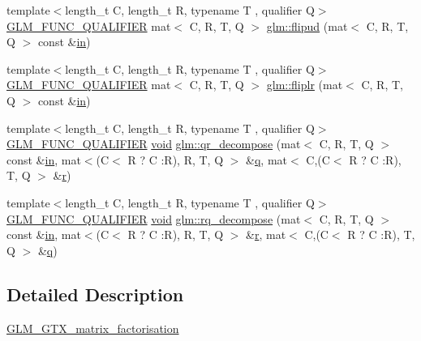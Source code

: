 \begin{DoxyCompactItemize}
\item 
{\footnotesize template$<$length\+\_\+t C, length\+\_\+t R, typename T , qualifier Q$>$ }\\\mbox{\hyperlink{setup_8hpp_a33fdea6f91c5f834105f7415e2a64407}{G\+L\+M\+\_\+\+F\+U\+N\+C\+\_\+\+Q\+U\+A\+L\+I\+F\+I\+ER}} mat$<$ C, R, T, Q $>$ \mbox{\hyperlink{group__gtx__matrix__factorisation_ga85003371f0ba97380dd25e8905de1870}{glm\+::flipud}} (mat$<$ C, R, T, Q $>$ const \&\mbox{\hyperlink{_s_d_l__opengl__glext_8h_a83ad0ee7f1e06b59c90271716e689080}{in}})
\item 
{\footnotesize template$<$length\+\_\+t C, length\+\_\+t R, typename T , qualifier Q$>$ }\\\mbox{\hyperlink{setup_8hpp_a33fdea6f91c5f834105f7415e2a64407}{G\+L\+M\+\_\+\+F\+U\+N\+C\+\_\+\+Q\+U\+A\+L\+I\+F\+I\+ER}} mat$<$ C, R, T, Q $>$ \mbox{\hyperlink{group__gtx__matrix__factorisation_gaf39f4e5f78eb29c1a90277d45b9b3feb}{glm\+::fliplr}} (mat$<$ C, R, T, Q $>$ const \&\mbox{\hyperlink{_s_d_l__opengl__glext_8h_a83ad0ee7f1e06b59c90271716e689080}{in}})
\item 
{\footnotesize template$<$length\+\_\+t C, length\+\_\+t R, typename T , qualifier Q$>$ }\\\mbox{\hyperlink{setup_8hpp_a33fdea6f91c5f834105f7415e2a64407}{G\+L\+M\+\_\+\+F\+U\+N\+C\+\_\+\+Q\+U\+A\+L\+I\+F\+I\+ER}} \mbox{\hyperlink{_s_d_l__opengles2__gl2ext_8h_ae5d8fa23ad07c48bb609509eae494c95}{void}} \mbox{\hyperlink{group__gtx__matrix__factorisation_ga77022dca1aa38add548f9f56a9f8071a}{glm\+::qr\+\_\+decompose}} (mat$<$ C, R, T, Q $>$ const \&\mbox{\hyperlink{_s_d_l__opengl__glext_8h_a83ad0ee7f1e06b59c90271716e689080}{in}}, mat$<$(C$<$ R ? C \+:R), R, T, Q $>$ \&\mbox{\hyperlink{_s_d_l__opengl_8h_a8fc1e7b9baaae687804c7eed46ca09c6}{q}}, mat$<$ C,(C$<$ R ? C \+:R), T, Q $>$ \&\mbox{\hyperlink{_s_d_l__opengl_8h_a42ce7cdc612e53abee15043f80220d97}{r}})
\item 
{\footnotesize template$<$length\+\_\+t C, length\+\_\+t R, typename T , qualifier Q$>$ }\\\mbox{\hyperlink{setup_8hpp_a33fdea6f91c5f834105f7415e2a64407}{G\+L\+M\+\_\+\+F\+U\+N\+C\+\_\+\+Q\+U\+A\+L\+I\+F\+I\+ER}} \mbox{\hyperlink{_s_d_l__opengles2__gl2ext_8h_ae5d8fa23ad07c48bb609509eae494c95}{void}} \mbox{\hyperlink{group__gtx__matrix__factorisation_ga4e022709c9e7eaad9d7cc315d2cdb05c}{glm\+::rq\+\_\+decompose}} (mat$<$ C, R, T, Q $>$ const \&\mbox{\hyperlink{_s_d_l__opengl__glext_8h_a83ad0ee7f1e06b59c90271716e689080}{in}}, mat$<$(C$<$ R ? C \+:R), R, T, Q $>$ \&\mbox{\hyperlink{_s_d_l__opengl_8h_a42ce7cdc612e53abee15043f80220d97}{r}}, mat$<$ C,(C$<$ R ? C \+:R), T, Q $>$ \&\mbox{\hyperlink{_s_d_l__opengl_8h_a8fc1e7b9baaae687804c7eed46ca09c6}{q}})
\end{DoxyCompactItemize}


\subsection{Detailed Description}
\mbox{\hyperlink{group__gtx__matrix__factorisation}{G\+L\+M\+\_\+\+G\+T\+X\+\_\+matrix\+\_\+factorisation}} 
